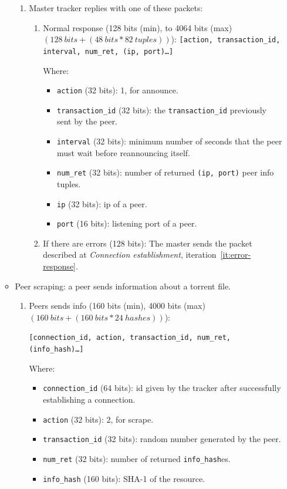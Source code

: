 \documentclass[twoside,a4paper,10pt]{article}
\begin{document}
\begin{itemize}
\begin{itemize}
\begin{enumerate}
    \item Master tracker replies with one of these packets:

      \begin{enumerate}
      \item Normal response (128 bits (min), to 4064 bits (max)
        $(128\ bits + (48\ bits * 82\ tuples))$):
        \texttt{[action, transaction\_id, interval, num\_ret, (ip, port)\ldots]}
        
        Where:
        \begin{itemize}
        \item \texttt{action} (32 bits): 1, for announce.
        \item \texttt{transaction\_id} (32 bits): the \texttt{transaction\_id}
          previously sent by the peer.
        \item \texttt{interval} (32 bits): minimum number of seconds that the
          peer must wait before reannouncing itself.
        \item \texttt{num\_ret} (32 bits): number of returned
          \texttt{(ip, port)} peer info tuples.
        \item \texttt{ip} (32 bits): ip of a peer.
        \item \texttt{port} (16 bits): listening port of a peer.
        \end{itemize}  

      \item If there are errors (128 bits):
        The master sends the packet described at
        \emph{Connection establishment}, iteration~\ref{it:error-response}.
      \end{enumerate}
    \end{enumerate}

  \item Peer scraping: a peer sends information about a torrent file.
    \begin{enumerate}
    \item Peers sends info (160 bits (min), 4000 bits (max)
      $(160\ bits + (160\ bits * 24\ hashes))$):

      \texttt{[connection\_id, action, transaction\_id, num\_ret,
          (info\_hash)\ldots]}

      Where:
      \begin{itemize}
      \item \texttt{connection\_id} (64 bits): id given by the tracker after
        successfully establishing a connection.
      \item \texttt{action} (32 bits): 2, for scrape.
      \item \texttt{transaction\_id} (32 bits): random number generated by
        the peer.
      \item \texttt{num\_ret} (32 bits): number of returned
        \texttt{info\_hash}es.
      \item \texttt{info\_hash} (160 bits): SHA-1 of the resource.
      \end{itemize}
      

\end{enumerate}
\end{itemize}
\end{itemize}
\end{document}
